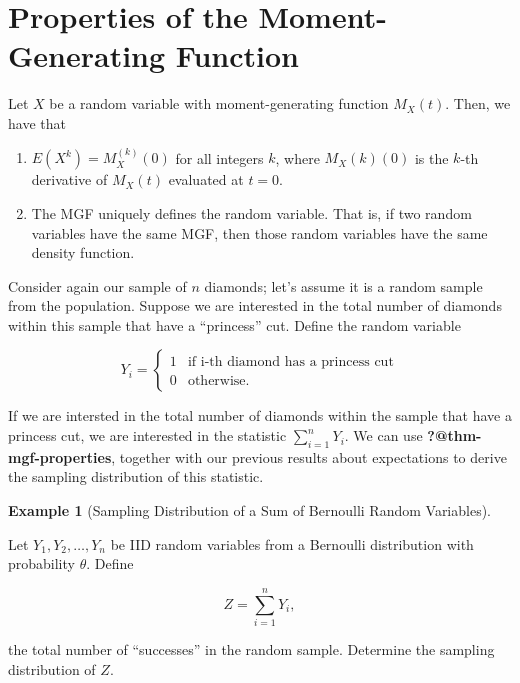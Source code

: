 \documentclass[
  letterpaper,
  DIV=11,
  numbers=noendperiod]{scrreprt}
\providecommand{\tightlist}{%
  \setlength{\itemsep}{0pt}\setlength{\parskip}{0pt}}\usepackage{longtable,booktabs,array}
\theoremstyle{definition}
\theoremstyle{definition}
\newtheorem{example}{Example}[chapter]
\theoremstyle{plain}
\theoremstyle{remark}
\begin{document}
\hypertarget{properties-of-the-moment-generating-function}{%
\section{Properties of the Moment-Generating
Function}\label{properties-of-the-moment-generating-function}}

Let \(X\) be a random variable with moment-generating function
\(M_X(t).\) Then, we have that

\begin{enumerate}
\def\labelenumi{\arabic{enumi}.}
\tightlist
\item
  \(E\left(X^k\right) = M_X^{(k)}(0)\) for all integers \(k\), where
  \(M_X(k)(0)\) is the \(k\)-th derivative of \(M_X(t)\) evaluated at
  \(t = 0\).
\item
  The MGF uniquely defines the random variable. That is, if two random
  variables have the same MGF, then those random variables have the same
  density function.
\end{enumerate}

Consider again our sample of \(n\) diamonds; let's assume it is a random
sample from the population. Suppose we are interested in the total
number of diamonds within this sample that have a ``princess'' cut.
Define the random variable

\[Y_i = \begin{cases} 1 & \text{if i-th diamond has a princess cut} \\ 0 & \text{otherwise}. \end{cases}\]

If we are intersted in the total number of diamonds within the sample
that have a princess cut, we are interested in the statistic
\(\sum_{i=1}^{n} Y_i\). We can use \textbf{?@thm-mgf-properties},
together with our previous results about expectations to derive the
sampling distribution of this statistic.

\begin{example}[Sampling Distribution of a Sum of Bernoulli Random
Variables]\protect\hypertarget{exm-bernoulli-sum}{}\label{exm-bernoulli-sum}

Let \(Y_1, Y_2, \dotsc, Y_n\) be IID random variables from a Bernoulli
distribution with probability \(\theta\). Define

\[Z = \sum_{i=1}^{n} Y_i,\]

the total number of ``successes'' in the random sample. Determine the
sampling distribution of \(Z\).

\end{example}
\end{document}
